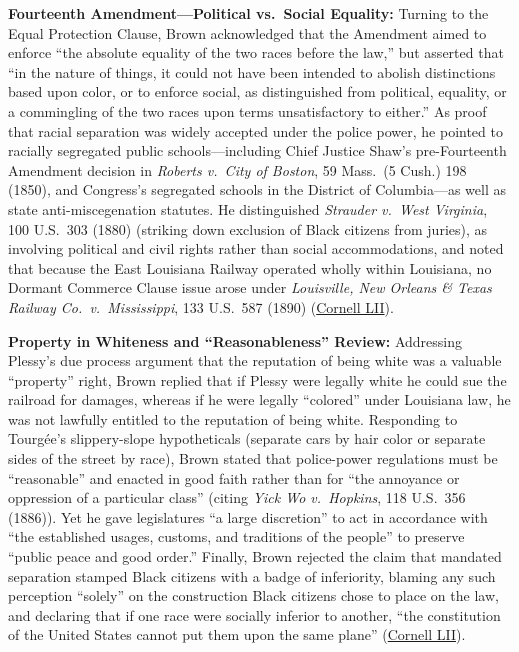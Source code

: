 \documentclass[12pt]{article}
\begin{document}
\textbf{Fourteenth Amendment---Political vs.\ Social Equality:} Turning to the Equal Protection Clause, Brown acknowledged that the Amendment aimed to enforce ``the absolute equality of the two races before the law,'' but asserted that ``in the nature of things, it could not have been intended to abolish distinctions based upon color, or to enforce social, as distinguished from political, equality, or a commingling of the two races upon terms unsatisfactory to either.'' As proof that racial separation was widely accepted under the police power, he pointed to racially segregated public schools---including Chief Justice Shaw's pre-Fourteenth Amendment decision in \textit{Roberts v.\ City of Boston}, 59 Mass.\ (5 Cush.) 198 (1850), and Congress's segregated schools in the District of Columbia---as well as state anti-miscegenation statutes. He distinguished \textit{Strauder v.\ West Virginia}, 100 U.S.\ 303 (1880) (striking down exclusion of Black citizens from juries), as involving political and civil rights rather than social accommodations, and noted that because the East Louisiana Railway operated wholly within Louisiana, no Dormant Commerce Clause issue arose under \textit{Louisville, New Orleans \& Texas Railway Co.\ v.\ Mississippi}, 133 U.S.\ 587 (1890) (\href{https://www.law.cornell.edu/supremecourt/text/163/537}{Cornell LII}).

\textbf{Property in Whiteness and ``Reasonableness'' Review:} Addressing Plessy's due process argument that the reputation of being white was a valuable ``property'' right, Brown replied that if Plessy were legally white he could sue the railroad for damages, whereas if he were legally ``colored'' under Louisiana law, he was not lawfully entitled to the reputation of being white. Responding to Tourg\'ee's slippery-slope hypotheticals (separate cars by hair color or separate sides of the street by race), Brown stated that police-power regulations must be ``reasonable'' and enacted in good faith rather than for ``the annoyance or oppression of a particular class'' (citing \textit{Yick Wo v.\ Hopkins}, 118 U.S.\ 356 (1886)). Yet he gave legislatures ``a large discretion'' to act in accordance with ``the established usages, customs, and traditions of the people'' to preserve ``public peace and good order.'' Finally, Brown rejected the claim that mandated separation stamped Black citizens with a badge of inferiority, blaming any such perception ``solely'' on the construction Black citizens chose to place on the law, and declaring that if one race were socially inferior to another, ``the constitution of the United States cannot put them upon the same plane'' (\href{https://www.law.cornell.edu/supremecourt/text/163/537}{Cornell LII}).
\end{document}
